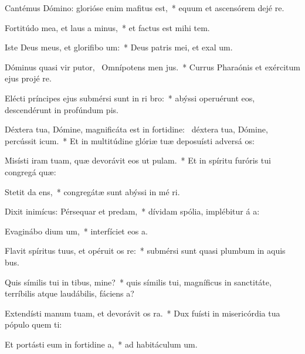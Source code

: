\item Cantémus Dómino: glorióse enim mafitus est,~* equum et ascensórem dejé  re.
\item Fortitúdo mea, et laus a minus,~* et factus est mihi  tem.
\item Iste Deus meus, et glorifibo um:~* Deus patris mei, et exal um.
\item Dóminus quasi vir putor,~\pscross{} Omnípotens men jus.~* Currus Pharaónis et exércitum ejus projé  re.
\item Elécti príncipes ejus submérsi sunt in ri bro:~* abýssi operuérunt eos, descendérunt in profúndum  pis.
\item Déxtera tua, Dómine, magnificáta est in fortidine:~\pscross{} déxtera tua, Dómine, percússit icum.~* Et in multitúdine glóriæ tuæ deposuísti adversá os:
\item Misísti iram tuam, quæ devorávit eos ut pulam.~* Et in spíritu furóris tui congregá  quæ:
\item Stetit da ens,~* congregátæ sunt abýssi in mé ri.
\item Dixit inimícus: Pérsequar et predam,~* dívidam spólia, implébitur á a:
\item Evaginábo dium um,~* interfíciet eos  a.
\item Flavit spíritus tuus, et opéruit os re:~* submérsi sunt quasi plumbum in aquis bus.
\item Quis símilis tui in tibus, mine?~* quis símilis tui, magníficus in sanctitáte, terríbilis atque laudábilis, fáciens a?
\item Extendísti manum tuam, et devorávit os ra.~* Dux fuísti in misericórdia tua pópulo quem ti:
\item Et portásti eum in fortidine a,~* ad habitáculum  um.
